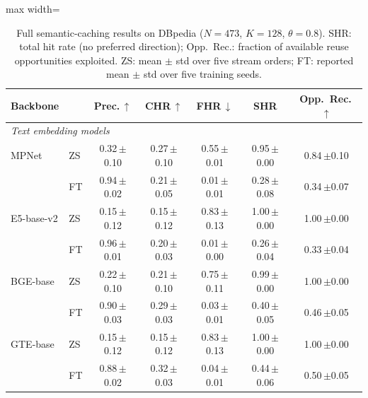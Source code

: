 \begin{table}[p]
\centering
\caption{Full semantic-caching results on DBpedia ($N=473$, $K=128$, $\theta=0.8$). SHR: total hit rate (no preferred direction); Opp.\ Rec.: fraction of available reuse opportunities exploited. ZS: mean $\pm$ std over five stream orders; FT: reported mean $\pm$ std over five training seeds.
}
\label{tab:app-caching-db}
\footnotesize
\setlength{\tabcolsep}{5pt}
\renewcommand{\arraystretch}{1.1}
\begin{adjustbox}{max width=\textwidth}
\begin{tabular}{ll ccccc}
\toprule
Backbone & & Prec.\,$\uparrow$ & CHR\,$\uparrow$ & FHR\,$\downarrow$ & SHR & Opp.\ Rec.\,$\uparrow$\\
\midrule
\multicolumn{7}{l}{\textit{Text embedding models}}\\
MPNet & ZS & 0.32\,{\scriptsize$\pm$0.10} & 0.27\,{\scriptsize$\pm$0.10} & 0.55\,{\scriptsize$\pm$0.01} & 0.95\,{\scriptsize$\pm$0.00} & 0.84\,{\scriptsize$\pm$0.10}\\
 & FT & 0.94\,{\scriptsize$\pm$0.02} & 0.21\,{\scriptsize$\pm$0.05} & 0.01\,{\scriptsize$\pm$0.01} & 0.28\,{\scriptsize$\pm$0.08} & 0.34\,{\scriptsize$\pm$0.07}\\
E5-base-v2 & ZS & 0.15\,{\scriptsize$\pm$0.12} & 0.15\,{\scriptsize$\pm$0.12} & 0.83\,{\scriptsize$\pm$0.13} & 1.00\,{\scriptsize$\pm$0.00} & 1.00\,{\scriptsize$\pm$0.00}\\
 & FT & 0.96\,{\scriptsize$\pm$0.01} & 0.20\,{\scriptsize$\pm$0.03} & 0.01\,{\scriptsize$\pm$0.00} & 0.26\,{\scriptsize$\pm$0.04} & 0.33\,{\scriptsize$\pm$0.04}\\
BGE-base & ZS & 0.22\,{\scriptsize$\pm$0.10} & 0.21\,{\scriptsize$\pm$0.10} & 0.75\,{\scriptsize$\pm$0.11} & 0.99\,{\scriptsize$\pm$0.00} & 1.00\,{\scriptsize$\pm$0.00}\\
 & FT & 0.90\,{\scriptsize$\pm$0.03} & 0.29\,{\scriptsize$\pm$0.03} & 0.03\,{\scriptsize$\pm$0.01} & 0.40\,{\scriptsize$\pm$0.05} & 0.46\,{\scriptsize$\pm$0.05}\\
GTE-base & ZS & 0.15\,{\scriptsize$\pm$0.12} & 0.15\,{\scriptsize$\pm$0.12} & 0.83\,{\scriptsize$\pm$0.13} & 1.00\,{\scriptsize$\pm$0.00} & 1.00\,{\scriptsize$\pm$0.00}\\
 & FT & 0.88\,{\scriptsize$\pm$0.02} & 0.32\,{\scriptsize$\pm$0.03} & 0.04\,{\scriptsize$\pm$0.01} & 0.44\,{\scriptsize$\pm$0.06} & 0.50\,{\scriptsize$\pm$0.05}\\

\end{tabular}
\end{adjustbox}
\end{table}
